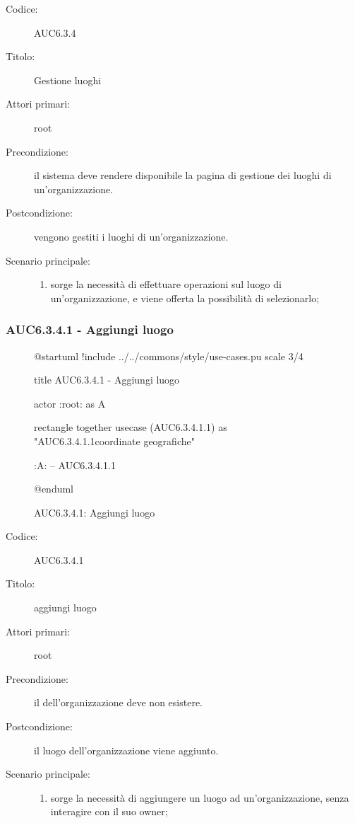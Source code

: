 \documentclass[casi-duso]{subfiles}
\begin{document}
\begin{description}
  \item[Codice:] AUC6.3.4
  \item[Titolo:] Gestione luoghi
  \item[Attori primari:] root
  \item[Precondizione:] il sistema deve rendere disponibile la pagina di gestione dei luoghi di un'organizzazione.
  \item[Postcondizione:] vengono gestiti i luoghi di un'organizzazione.
  \item[Scenario principale:]
  \begin{enumerate}
    \item sorge la necessità di effettuare operazioni sul luogo di un'organizzazione, e viene offerta la possibilità di selezionarlo;
  \end{enumerate}
\end{description}

\subsubsection{AUC6.3.4.1 - Aggiungi luogo}%
\label{subsub:AUC6.3.4.1}

\begin{figure}[h!] 
  \centering 
  \begin{plantuml}
  @startuml 
  !include ../../commons/style/use-cases.pu
  scale 3/4

  title AUC6.3.4.1 - Aggiungi luogo

  actor :root: as A

  rectangle {
    together {
      usecase (AUC6.3.4.1.1) as "AUC6.3.4.1.1\nInserisci coordinate geografiche"
    }
  }

  :A: -- AUC6.3.4.1.1

  @enduml
  \end{plantuml} 
  \caption{AUC6.3.4.1: Aggiungi luogo} 
  \label{fig:auc6_3_4_1} 
\end{figure}

\begin{description}
  \item[Codice:] AUC6.3.4.1
  \item[Titolo:] aggiungi luogo
  \item[Attori primari:] root
  \item[Precondizione:] il  dell'organizzazione deve non esistere.
  \item[Postcondizione:] il luogo dell'organizzazione viene aggiunto.
  \item[Scenario principale:]
  \begin{enumerate}
    \item sorge la necessità di aggiungere un luogo ad un'organizzazione, senza interagire con il suo owner;
  \end{enumerate}
\end{description}
\end{document}
